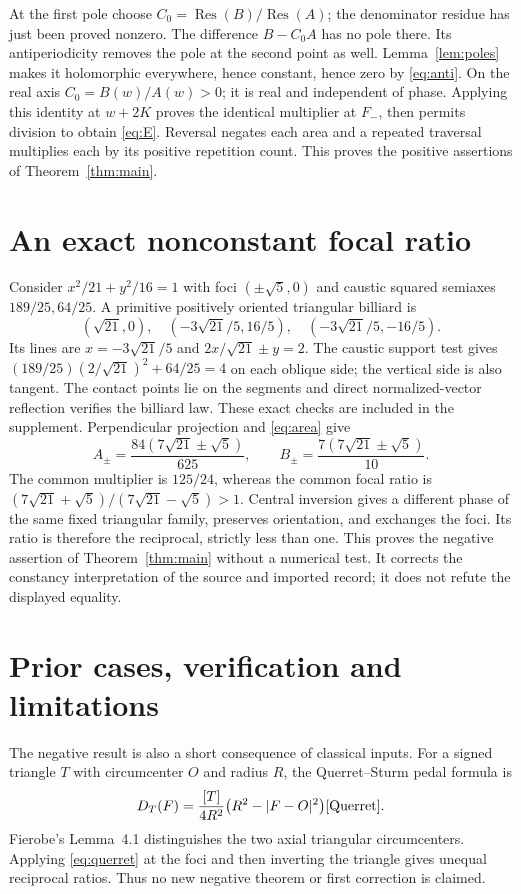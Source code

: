 \documentclass[11pt]{article}
\begin{document}
At the first pole choose
$C_0=\operatorname{Res}(B)/\operatorname{Res}(A)$; the denominator
residue has just been proved nonzero. The difference $B-C_0A$
has no pole there. Its antiperiodicity removes the pole at the second
point as well. Lemma~\ref{lem:poles} makes it holomorphic everywhere,
hence constant, hence zero by \eqref{eq:anti}.
On the real axis $C_0=B(w)/A(w)>0$; it is real and independent of phase.
Applying this identity at $w+2K$ proves the identical multiplier at
$F_-$, then permits division to obtain \eqref{eq:E}.
Reversal negates each area and a repeated traversal multiplies each
by its positive repetition count. This proves the positive assertions
of Theorem~\ref{thm:main}.

\section{An exact nonconstant focal ratio}
Consider $x^2/21+y^2/16=1$ with foci $(\pm\sqrt5,0)$ and caustic
squared semiaxes $189/25,64/25$. A primitive positively oriented
triangular billiard is
\begin{equation}\label{eq:triangle}
 (\sqrt{21},0),\quad(-3\sqrt{21}/5,16/5),\quad
 (-3\sqrt{21}/5,-16/5).
\end{equation}
Its lines are $x=-3\sqrt{21}/5$ and
$2x/\sqrt{21}\pm y=2$. The caustic support test gives
$(189/25)(2/\sqrt{21})^2+64/25=4$ on each oblique side;
the vertical side is also tangent. The contact points lie on the
segments and direct normalized-vector reflection verifies the billiard
law. These exact checks are included in the supplement.
Perpendicular projection and \eqref{eq:area} give
\begin{equation}\label{eq:exactareas}
 A_\pm=\frac{84(7\sqrt{21}\pm\sqrt5)}{625},\qquad
 B_\pm=\frac{7(7\sqrt{21}\pm\sqrt5)}{10}.
\end{equation}
The common multiplier is $125/24$, whereas the common focal ratio is
$(7\sqrt{21}+\sqrt5)/(7\sqrt{21}-\sqrt5)>1$.
Central inversion gives a different phase of the same fixed triangular
family, preserves orientation, and exchanges the foci. Its ratio is
therefore the reciprocal, strictly less than one. This proves the
negative assertion of Theorem~\ref{thm:main} without a numerical test.
It corrects the constancy interpretation of the source and imported
record; it does not refute the displayed equality.

\section{Prior cases, verification and limitations}
The negative result is also a short consequence of classical inputs.
For a signed triangle $T$ with circumcenter $O$ and radius $R$,
the Querret--Sturm pedal formula is
\begin{equation}\label{eq:querret}
 D_T(F)=\frac{[T]}{4R^2}\bigl(R^2-|F-O|^2\bigr) \cite{Querret}.
\end{equation}
Fierobe's Lemma~4.1 \cite{Fierobe} distinguishes the two axial
triangular circumcenters. Applying \eqref{eq:querret} at the foci
and then inverting the triangle gives unequal reciprocal ratios.
Thus no new negative theorem or first correction is claimed.
\end{document}
